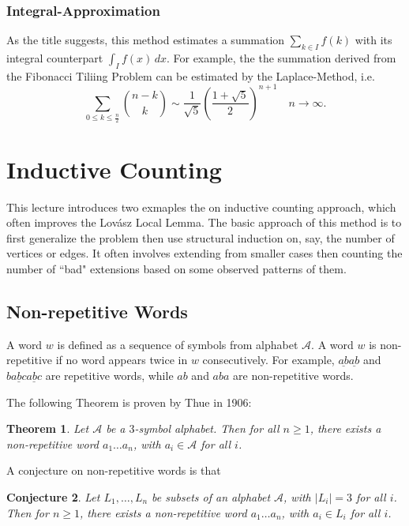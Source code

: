 \documentclass[a4paper]{article}
\newtheorem{theorem}{Theorem}[section]
\newtheorem{conjecture}[theorem]{Conjecture}
\begin{document}
\subsubsection*{Integral-Approximation}

As the title suggests, this method estimates a summation $\sum_{k \in I} f(k)$ with its integral
counterpart $\int_I f(x) \, dx$. For example, the the summation derived from the Fibonacci Tiliing
Problem can be estimated by the Laplace-Method, i.e.
\[
  \sum_{0 \leq k \leq \frac{n}{2}} \binom{n - k}{k} \sim \frac{1}{\sqrt{5}}\left(\frac{1 + \sqrt{5}}{2}\right)^{n + 1} \quad n \to \infty.
\]

\newpage

\section{Inductive Counting}

This lecture introduces two exmaples the on inductive counting approach, which often improves the
Lovász Local Lemma. The basic approach of this method is to first generalize the problem then use
structural induction on, say, the number of vertices or edges. It often involves extending from
smaller cases then counting the number of ``bad" extensions based on some observed patterns of them.

\subsection*{Non-repetitive Words}

A word $w$ is defined as a sequence of symbols from alphabet $\mathcal{A}$. A word $w$ is
non-repetitive if no word appears twice in $w$ consecutively. For example,
$\underline{ab}\underline{ab}$ and $b\underline{abc}\underline{abc}$ are repetitive words, while
$ab$ and $aba$ are non-repetitive words.

The following Theorem is proven by Thue in 1906:
\begin{theorem}
  Let $\mathcal{A}$ be a $3$-symbol alphabet. Then for all $n \geq 1$, there exists a non-repetitive
  word $a_1\ldots a_n$, with $a_i \in \mathcal{A}$ for all $i$.
\end{theorem}

A conjecture on non-repetitive words is that

\begin{conjecture}
  Let $L_1, \ldots, L_n$ be subsets of an alphabet $\mathcal{A}$, with $|L_i| = 3$ for all $i$. Then
  for $n \geq 1$, there exists a non-repetitive word $a_1\ldots a_n$, with $a_i \in L_i$ for all
  $i$.
\end{conjecture}
\end{document}

